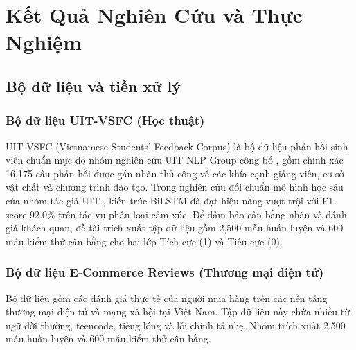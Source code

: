 \documentclass[12pt,a4paper]{article}
\begin{document}
\newpage
\section{Kết Quả Nghiên Cứu và Thực Nghiệm}\label{sec:chuong3}

\subsection{Bộ dữ liệu và tiền xử lý}\label{sec:datasets_prep}

\subsubsection{Bộ dữ liệu UIT-VSFC (Học thuật)}\label{sec:uit_vsfc_dataset}
UIT-VSFC (Vietnamese Students’ Feedback Corpus) là bộ dữ liệu phản hồi sinh viên chuẩn mực do nhóm nghiên cứu UIT NLP Group công bố \cite{nguyen2018uit}, gồm chính xác 16,175 câu phản hồi được gán nhãn thủ công về các khía cạnh giảng viên, cơ sở vật chất và chương trình đào tạo. Trong nghiên cứu đối chuẩn mô hình học sâu của nhóm tác giả UIT \cite{nguyen2018deep}, kiến trúc BiLSTM đã đạt hiệu năng vượt trội với F1-score 92.0\% trên tác vụ phân loại cảm xúc. Để đảm bảo cân bằng nhãn và đánh giá khách quan, đề tài trích xuất tập dữ liệu gồm 2,500 mẫu huấn luyện và 600 mẫu kiểm thử cân bằng cho hai lớp Tích cực (1) và Tiêu cực (0).

\subsubsection{Bộ dữ liệu E-Commerce Reviews (Thương mại điện tử)}\label{sec:ecommerce_dataset}
Bộ dữ liệu gồm các đánh giá thực tế của người mua hàng trên các nền tảng thương mại điện tử và mạng xã hội tại Việt Nam. Tập dữ liệu này chứa nhiều từ ngữ đời thường, teencode, tiếng lóng và lỗi chính tả nhẹ. Nhóm trích xuất 2,500 mẫu huấn luyện và 600 mẫu kiểm thử cân bằng.
\end{document}
